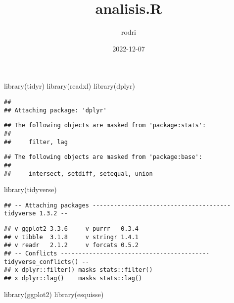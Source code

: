 \documentclass[
]{article}
\title{analisis.R}
\author{rodri}
\date{2022-12-07}
\newenvironment{Shaded}{\begin{snugshade}}{\end{snugshade}}
\newcommand{\FunctionTok}[1]{\textcolor[rgb]{0.00,0.00,0.00}{#1}}
\newcommand{\NormalTok}[1]{#1}
\begin{document}
\maketitle

\begin{Shaded}
\begin{Highlighting}[]
\FunctionTok{library}\NormalTok{(tidyr)}
\FunctionTok{library}\NormalTok{(readxl)}
\FunctionTok{library}\NormalTok{(dplyr)}
\end{Highlighting}
\end{Shaded}

\begin{verbatim}
## 
## Attaching package: 'dplyr'
\end{verbatim}

\begin{verbatim}
## The following objects are masked from 'package:stats':
## 
##     filter, lag
\end{verbatim}

\begin{verbatim}
## The following objects are masked from 'package:base':
## 
##     intersect, setdiff, setequal, union
\end{verbatim}

\begin{Shaded}
\begin{Highlighting}[]
\FunctionTok{library}\NormalTok{(tidyverse)}
\end{Highlighting}
\end{Shaded}

\begin{verbatim}
## -- Attaching packages --------------------------------------- tidyverse 1.3.2 --
\end{verbatim}

\begin{verbatim}
## v ggplot2 3.3.6     v purrr   0.3.4
## v tibble  3.1.8     v stringr 1.4.1
## v readr   2.1.2     v forcats 0.5.2
## -- Conflicts ------------------------------------------ tidyverse_conflicts() --
## x dplyr::filter() masks stats::filter()
## x dplyr::lag()    masks stats::lag()
\end{verbatim}

\begin{Shaded}
\begin{Highlighting}[]
\FunctionTok{library}\NormalTok{(ggplot2)}
\FunctionTok{library}\NormalTok{(esquisse)}
\end{Highlighting}
\end{Shaded}
\end{document}
